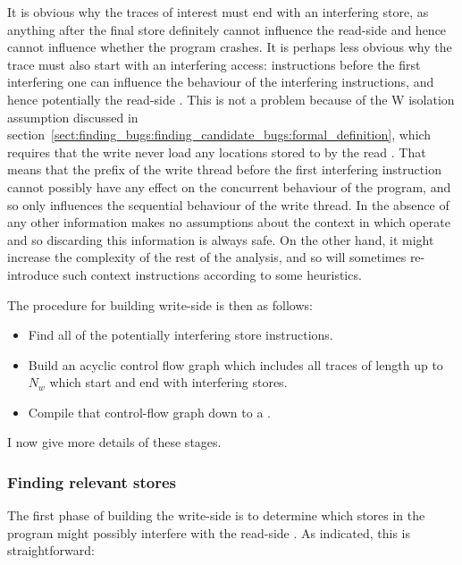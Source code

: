 It is obvious why the traces of interest must end with an interfering
store, as anything after the final store definitely cannot influence
the read-side {\StateMachine} and hence cannot influence whether the
program crashes.  It is perhaps less obvious why the trace must also
start with an interfering access: instructions before the first
interfering one can influence the behaviour of the interfering
instructions, and hence potentially the read-side {\StateMachine}.
This is not a problem because of the W isolation assumption discussed
in
section~\ref{sect:finding_bugs:finding_candidate_bugs:formal_definition},
which requires that the write {\StateMachine} never load any locations
stored to by the read {\StateMachine}.  That means that the prefix of
the write thread before the first interfering instruction cannot
possibly have any effect on the concurrent behaviour of the program,
and so only influences the sequential behaviour of the write thread.
In the absence of any other information {\technique} makes no
assumptions about the context in which {\StateMachines} operate and so
discarding this information is always safe.  On the other hand, it
might increase the complexity of the rest of the analysis, and so
{\implementation} will sometimes re-introduce such context
instructions according to some heuristics\needCite{}.  

The procedure for building write-side {\StateMachines} is then as
follows:

\begin{itemize}
\item
  Find all of the potentially interfering store instructions.
\item
  Build an acyclic control flow graph which includes all traces of
  length up to $N_w$ which start and end with interfering stores.
\item
  Compile that control-flow graph down to a \StateMachine.
\end{itemize}

I now give more details of these stages.

\subsubsection{Finding relevant stores}

The first phase of building the write-side \StateMachines is to
determine which stores in the program might possibly interfere with
the read-side {\StateMachine}.  As indicated, this is straightforward:

